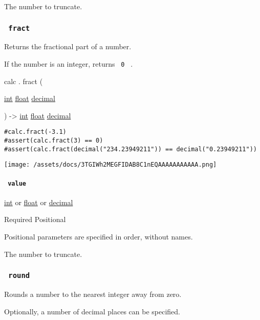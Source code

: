 The number to truncate.

\subsubsection{\texorpdfstring{\texttt{\ fract\ }}{ fract }}\label{functions-fract}

Returns the fractional part of a number.

If the number is an integer, returns \texttt{\ 0\ } .

calc { . } { fract } (

{ \href{/docs/reference/foundations/int/}{int}
\href{/docs/reference/foundations/float/}{float}
\href{/docs/reference/foundations/decimal/}{decimal} }

) -\textgreater{} \href{/docs/reference/foundations/int/}{int}
\href{/docs/reference/foundations/float/}{float}
\href{/docs/reference/foundations/decimal/}{decimal}

\begin{verbatim}
#calc.fract(-3.1)
#assert(calc.fract(3) == 0)
#assert(calc.fract(decimal("234.23949211")) == decimal("0.23949211"))
\end{verbatim}

\texttt{[image: /assets/docs/3TGIWh2MEGFIDAB8C1nEQAAAAAAAAAAA.png]}

\paragraph{\texorpdfstring{\texttt{\ value\ }}{ value }}\label{functions-fract-value}

\href{/docs/reference/foundations/int/}{int} {or}
\href{/docs/reference/foundations/float/}{float} {or}
\href{/docs/reference/foundations/decimal/}{decimal}

{Required} {{ Positional }}

\label{functions-fract-value-positional-tooltip}
Positional parameters are specified in order, without names.

The number to truncate.

\subsubsection{\texorpdfstring{\texttt{\ round\ }}{ round }}\label{functions-round}

Rounds a number to the nearest integer away from zero.

Optionally, a number of decimal places can be specified.

